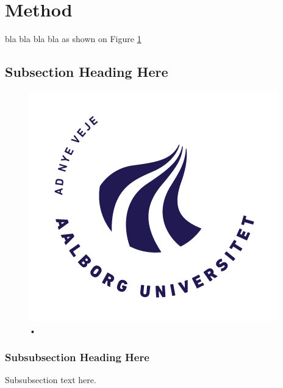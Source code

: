 \section{Method}
\label{Method}
%

bla bla bla bla as shown on Figure \ref{fig:aau}
\subsection{Subsection Heading Here}
\begin{figure}
\includegraphics[]{Figure/AAU_logo_2012.png}
\caption{•}
\label{fig:aau}
\end{figure}

\subsubsection{Subsubsection Heading Here}
Subsubsection text here.
